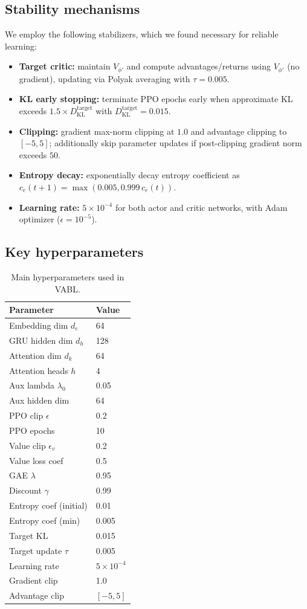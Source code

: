 \documentclass{article}
\theoremstyle{plain}
\theoremstyle{definition}
\theoremstyle{remark}
\begin{document}
\subsection{Stability mechanisms}
\label{sec:stability}
We employ the following stabilizers, which we found necessary for reliable learning:
\begin{itemize}
\item \textbf{Target critic:} maintain $V_{\phi'}$ and compute advantages/returns using $V_{\phi'}$ (no gradient), updating via Polyak averaging with $\tau{=}0.005$.
\item \textbf{KL early stopping:} terminate PPO epochs early when approximate KL exceeds $1.5\times D_{\mathrm{KL}}^{\mathrm{target}}$ with $D_{\mathrm{KL}}^{\mathrm{target}}{=}0.015$.
\item \textbf{Clipping:} gradient max-norm clipping at $1.0$ and advantage clipping to $[-5,5]$; additionally skip parameter updates if post-clipping gradient norm exceeds $50$.
\item \textbf{Entropy decay:} exponentially decay entropy coefficient as $c_e(t{+}1)=\max(0.005,0.999\,c_e(t))$.
\item \textbf{Learning rate:} $5\times10^{-4}$ for both actor and critic networks, with Adam optimizer ($\epsilon=10^{-5}$).
\end{itemize}

\subsection{Key hyperparameters}
\begin{table}[h]
\centering
\begin{tabular}{ll}
\toprule
\textbf{Parameter} & \textbf{Value} \\
\midrule
Embedding dim $d_e$ & 64 \\
GRU hidden dim $d_h$ & 128 \\
Attention dim $d_k$ & 64 \\
Attention heads $h$ & 4 \\
Aux lambda $\lambda_0$ & 0.05 \\
Aux hidden dim & 64 \\
PPO clip $\epsilon$ & 0.2 \\
PPO epochs & 10 \\
Value clip $\epsilon_v$ & 0.2 \\
Value loss coef & 0.5 \\
GAE $\lambda$ & 0.95 \\
Discount $\gamma$ & 0.99 \\
Entropy coef (initial) & 0.01 \\
Entropy coef (min) & 0.005 \\
Target KL & 0.015 \\
Target update $\tau$ & 0.005 \\
Learning rate & $5 \times 10^{-4}$ \\
Gradient clip & 1.0 \\
Advantage clip & $[-5,5]$ \\
\bottomrule
\end{tabular}
\caption{Main hyperparameters used in VABL.}
\label{tab:hyperparams}
\end{table}
\end{document}
